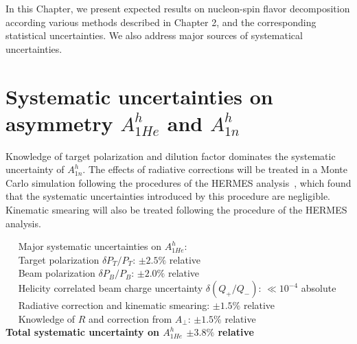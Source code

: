 
In this Chapter, we present expected results on nucleon-spin flavor decomposition according various methods described in Chapter 2, and 
the corresponding statistical uncertainties.  We also address major sources of systematical uncertainties.

\section{Systematic uncertainties on asymmetry $A_{1He}^h$ and $A_{1n}^h$}

Knowledge of target polarization and dilution factor dominates the systematic uncertainty of $A_{1n}^h$.
The effects of radiative corrections will be treated in a Monte Carlo simulation
following the procedures of the HERMES analysis~\cite{hermes2002}, which found that the 
systematic uncertainties introduced by this procedure are negligible.  
Kinematic smearing will also be treated following the procedure of the HERMES analysis. 

\vspace{5.0mm}
\noindent ~\hspace{0.25cm} ~Major systematic uncertainties on $A_{1He}^h$:  \\
\noindent ~\hspace{0.25cm} ~Target polarization $\delta P_T/P_T$:  \hfill           $\pm 2.5\%$  relative \\ 
\noindent ~\hspace{0.25cm} ~Beam polarization $\delta P_B/P_B$:    \hfill           $\pm 2.0 \%$ relative \\
\noindent ~\hspace{0.25cm} ~Helicity correlated beam charge uncertainty $\delta (Q_+/Q_-)$:   \hfill  $\ll 10^{-4}$ absolute \\
\noindent ~\hspace{0.25cm} ~Radiative correction and kinematic smearing:                \hfill           $\pm 1.5 \%$  relative \\
\noindent ~\hspace{0.25cm} ~Knowledge of $R$ and correction from $A_{\perp}$:                \hfill           $\pm 1.5 \%$  relative \\
\vspace{-3.0mm}
{\bf 
\noindent \hspace{0.5cm} Total systematic uncertainty on $A_{1He}^h$  \hfill          $\pm 3.8 \%$  relative } \\

